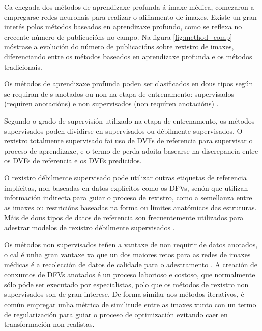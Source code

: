 Ca chegada dos métodos de aprendizaxe profunda á imaxe médica, comezaron a empregarse redes neuronais para realizar o aliñamento de imaxes.
Existe un gran interés polos métodos baseados en aprendizaxe profundo, como se reflexa no crecente número de publicacións no campo. Na figura \ref{fig:method_comp} móstrase a evolución do número de publicacións sobre rexistro de imaxes, diferenciando entre os métodos baseados en aprendizaxe profunda e os métodos tradicionais.

Os métodos de aprendizaxe profunda poden ser clasificados en dous tipos según se requiran de s anotados ou non na etapa de entrenamento:
supervisados (requíren anotacións) e non supervisados (non requíren anotacións) \cite{nie2024medicalimageregistrationapplication}.

Segundo o grado de supervisión utilizado na etapa de entrenamento, os métodos supervisados poden dividirse en supervisados ou débilmente supervisados.
O rexistro totalmente supervisado fai uso de DVFs de referencia para supervisar o proceso de aprendizaxe, e o termo de perda adoita basearse na discrepancia entre os DVFs de referencia e os DVFs predicidos.

O rexistro débilmente supervisado pode utilizar outras etiquetas de referencia implícitas, non baseadas en datos explícitos como os DFVs, senón que utilizan información indirecta para guiar o proceso de rexistro, como a semellanza entre as imaxes ou restricións baseadas na forma ou límites anatómicos das estruturas.
Máis de dous tipos de datos de referencia son frecuentemente utilizados para adestrar modelos de rexistro débilmente supervisados \cite{bharati2022deeplearningmedicalimage}.

Os métodos non supervisados teñen a vantaxe de non requirir de datos anotados, o cal é unha gran vantaxe xa que un dos maiores retos para as redes de imaxes médicas é a recolección de datos de calidade para o adestramento \cite{medicalimageanalysis}.
A creación de conxuntos de DFVs anotados é un proceso laborioso e costoso, que normalmente sólo póde ser executado por especialistas, polo que os métodos de rexistro non supervisados son de gran interese.
De forma similar aos métodos iterativos, é común empregar unha métrica de similitude entre as imaxes xunto con un termo de regularización para guiar o proceso de optimización evitando caer en transformación non realistas.

